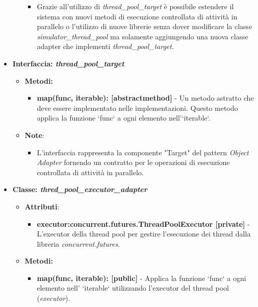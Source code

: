 \begin{itemize}
\begin{itemize}
\begin{itemize}
            \item Grazie all'utilizzo di \textit{thread\_pool\_target} è possibile estendere il sistema con nuovi metodi di esecuzione controllata di attività in parallelo o l'utilizzo di nuove librerie senza dover modificare la classe \textit{simulator\_thread\_pool} ma solamente aggiungendo una nuova classe adapter che implementi \textit{thread\_pool\_target}.
        \end{itemize}
    \end{itemize}
    \item{\textbf{Interfaccia: \textit{thread\_pool\_target}}}
    \begin{itemize}
        \item\textbf{Metodi: }
        \begin{itemize}
            \item \textbf{map(func, iterable): [abstractmethod]} - Un metodo astratto che deve essere implementato nelle implementazioni. Questo metodo applica la funzione `func` a ogni elemento nell'`iterable`.
        \end{itemize}
        \item\textbf{Note}:
        \begin{itemize}
            \item L'interfaccia rappresenta la componente "Target" del pattern \textit{Object Adapter} fornendo un contratto per le operazioni di esecuzione controllata di attività in parallelo.
        \end{itemize}
    \end{itemize}
    \item{\textbf{Classe: \textit{thred\_pool\_executor\_adapter}}}
    \begin{itemize}
        \item\textbf{Attributi}:
        \begin{itemize}
            \item \textbf{executor:concurrent.futures.ThreadPoolExecutor [private]} - L'executor della thread pool per gestire l'esecuzione dei thread dalla libreria \textit{concurrent.futures}. 
        \end{itemize}
        \item \textbf{Metodi: }
        \begin{itemize}
            \item \textbf{map(func, iterable): [public]} - Applica la funzione `func` a ogni elemento nell' `iterable` utilizzando l'executor del thread pool (\textit{executor}).
        \end{itemize}

\end{itemize}
\end{itemize}
